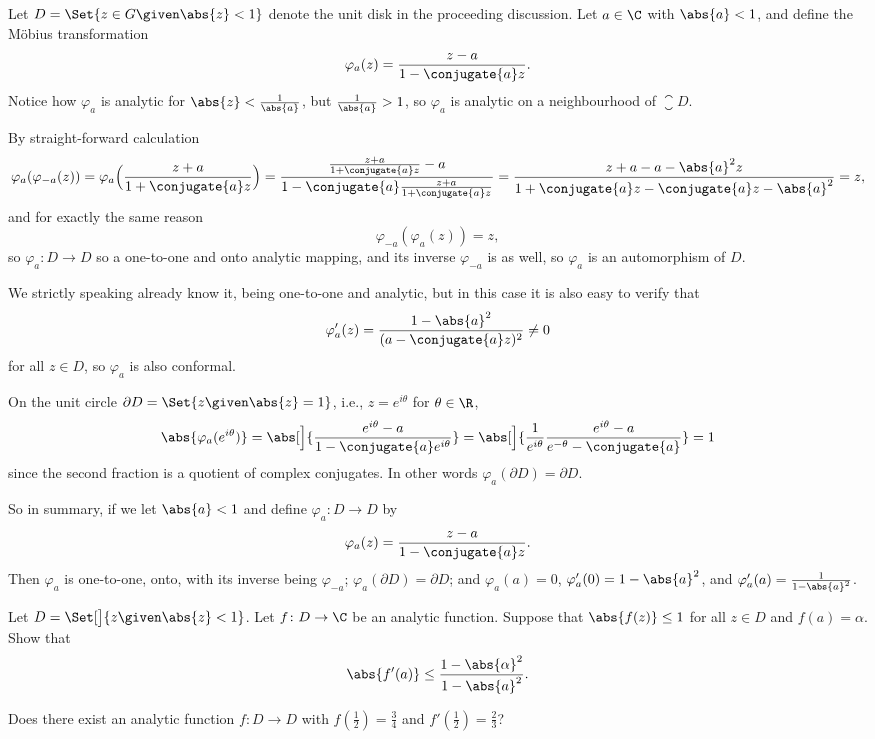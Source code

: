 Let $D = \Set{z \in G \given \abs{z} < 1}$ denote the unit disk in the proceeding discussion.
Let $a \in \C$ with $\abs{a} < 1$, and define the Möbius transformation
\[
	\varphi_a(z) = \frac{z - a}{1 - \conjugate{a} z}.
\]
Notice how $\varphi_a$ is analytic for $\abs{z} < \frac{1}{\abs{a}}$, but $\frac{1}{\abs{a}} > 1$, so $\varphi_a$ is analytic on a neighbourhood of $\closure{D}$.

By straight-forward calculation
\[
	\varphi_a(\varphi_{-a}(z)) = \varphi_a \Bigl ( \frac{z + a}{1 + \conjugate{a} z} \Bigr ) = \frac{\frac{z + a}{1 + \conjugate{a} z} - a}{1 - \conjugate{a} \frac{z + a}{1 + \conjugate{a} z}} = \frac{z + a - a - \abs{a}^2 z}{1 + \conjugate{a} z - \conjugate{a} z - \abs{a}^2} = z,
\]
and for exactly the same reason
\[
	\varphi_{-a} ( \varphi_a(z)) = z,
\]
so $\varphi_a \colon D \to D$ so a one-to-one and onto analytic mapping, and its inverse $\varphi_{-a}$ is as well, so $\varphi_a$ is an automorphism of $D$.

We strictly speaking already know it, being one-to-one and analytic, but in this case it is also easy to verify that
\[
	\varphi_a'(z) = \frac{1 - \abs{a}^2}{(a - \conjugate{a} z)^2} \neq 0
\]
for all $z \in D$, so $\varphi_a$ is also conformal.

On the unit circle $\partial D = \Set{z \given \abs{z} = 1}$, i.e., $z = e^{i \theta}$ for $\theta \in \R$,
\[
	\abs{\varphi_a(e^{i \theta})} = \abs[\Big]{\frac{e^{i \theta} - a}{1 - \conjugate{a} e^{i \theta}}} = \abs[\Big]{\frac{1}{e^{i \theta}}\frac{e^{i \theta} - a}{e^{- \theta} - \conjugate{a}}} = 1
\]
since the second fraction is a quotient of complex conjugates.
In other words $\varphi_a(\partial D) = \partial D$.

So in summary, if we let $\abs{a} < 1$ and define $\varphi_a \colon D \to D$ by
\[
	\varphi_a(z) = \frac{z - a}{1 - \conjugate{a} z}.
\]
Then $\varphi_a$ is one-to-one, onto, with its inverse being $\varphi_{-a}$; $\varphi_a(\partial D) = \partial D$; and $\varphi_a(a) = 0$, $\varphi_a'(0) = 1 - \abs{a}^2$, and $\varphi_a'(a) = \frac{1}{1 - \abs{a}^2}$.

\begin{exercise}
	\begin{parts}
		\item Let $D = \Set[\big]{z \given \abs{z} < 1}$.
		Let $f \colon D \to \C$ be an analytic function.
		Suppose that $\abs{f(z)} \leq 1$ for all $z \in D$ and $f(a) = \alpha$.
		Show that
		\[
			\abs{f'(a)} \leq \frac{1 - \abs{\alpha}^2}{1 - \abs{a}^2}.
		\]
		\item Does there exist an analytic function $f \colon D \to D$ with $f(\frac{1}{2}) = \frac{3}{4}$ and $f'(\frac{1}{2}) = \frac{2}{3}$? \qedhere
	\end{parts}
\end{exercise}

